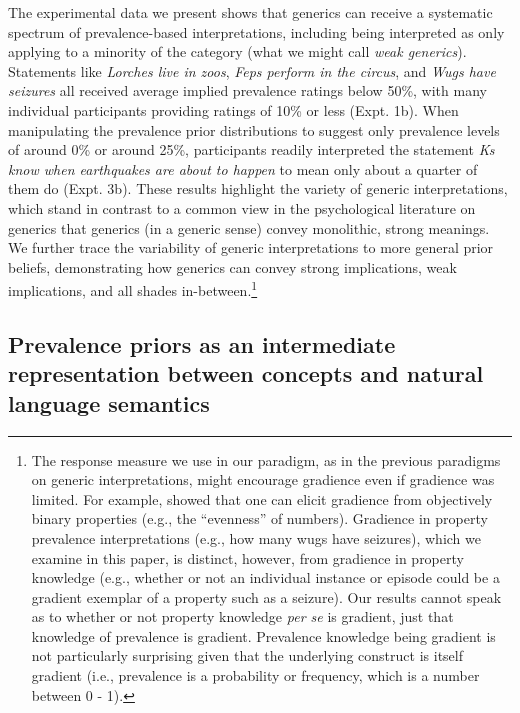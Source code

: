\documentclass[floatsintext,man]{apa6}
\let\rmarkdownfootnote\footnote%
\def\footnote{\protect\rmarkdownfootnote}
\begin{document}
%
The experimental data we present shows that generics can receive a systematic spectrum of prevalence-based interpretations, including being interpreted as only applying to a minority of the category (what we might call \emph{weak generics}). 
Statements like \emph{Lorches live in zoos}, \emph{Feps perform in the circus}, and \emph{Wugs have seizures} all received average implied prevalence ratings below 50\%, with many individual participants providing ratings of 10\% or less (Expt. 1b).
When manipulating the prevalence prior distributions to suggest only prevalence levels of around 0\% or around 25\%, participants readily interpreted the statement \emph{Ks know when earthquakes are about to happen} to mean only about a quarter of them do (Expt. 3b).
These results highlight the variety of generic interpretations, which stand in contrast to a common view in the psychological literature on generics that generics (in a generic sense) convey monolithic, strong meanings.
We further trace the variability of generic interpretations to more general prior beliefs, demonstrating how generics can convey strong implications, weak implications, and all shades in-between.\footnote{
The response measure we use in our paradigm, as in the previous paradigms on generic interpretations, might encourage gradience even if gradience was limited.
For example,  showed that one can elicit gradience from objectively binary properties (e.g., the ``evenness'' of numbers).
Gradience in property prevalence interpretations (e.g., how many wugs have seizures), which we examine in this paper, is distinct, however, from gradience in property knowledge (e.g., whether or not an individual instance or episode could be a gradient exemplar of a property such as a seizure). Our results cannot speak as to whether or not property knowledge \emph{per se} is gradient, just that knowledge of prevalence is gradient. Prevalence knowledge being gradient is not particularly surprising given that the underlying construct is itself gradient (i.e., prevalence is a probability or frequency, which is a number between 0 - 1). 
}




\subsection{Prevalence priors as an intermediate representation between concepts and natural language semantics}
\end{document}
